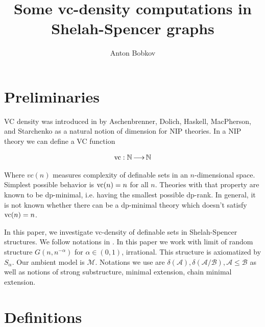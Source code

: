 \documentclass{amsart}
\title{Some vc-density computations in Shelah-Spencer graphs}
\author{Anton Bobkov}
\newcommand{\MM}{\mathscr M}
\newcommand{\A}{\mathcal A}
\newcommand{\B}{\mathcal B}
\begin{document}
\maketitle

\section{Preliminaries}

VC density was introduced in \cite{vc_density} by Aschenbrenner, Dolich, Haskell, MacPherson, and Starchenko as a natural notion of dimension for NIP theories. In a NIP theory we can define a VC function

\begin{align*}
	\operatorname{vc} : \mathbb{N} \operatorname{\longrightarrow} \mathbb{N}
\end{align*}

Where $vc(n)$ measures complexity of definable sets in an $n$-dimensional space. Simplest possible behavior is $\operatorname{vc}(n) = n$ for all $n$. Theories with that property are known to be dp-minimal, i.e. having the smallest possible dp-rank. In general, it is not known whether there can be a dp-minimal theory which doesn't satisfy $\operatorname{vc}(n)=n$.

In this paper, we investigate vc-density of definable sets in Shelah-Spencer structures.
We follow notations in \cite{laskowski}.
In this paper we work with limit of random structure $G(n, n^{-\alpha})$ for $\alpha \in (0,1)$, irrational.
This structure is axiomatized by $S_\alpha$.
Our ambient model is $\MM$.
Notations we use are $\delta(\A), \delta(\A/\B), \A \leq \B$ as well as notions of strong substructure, minimal extension, chain minimal extension.


\section{Definitions}
\end{document}
